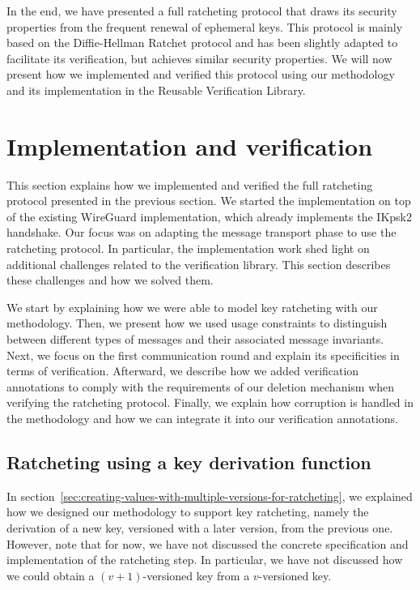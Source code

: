 In the end, we have presented a full ratcheting protocol that draws its security properties from the frequent renewal of ephemeral keys. This protocol is mainly based on the Diffie-Hellman Ratchet protocol and has been slightly adapted to facilitate its verification, but achieves similar security properties.
We will now present how we implemented and verified this protocol using our methodology and its implementation in the Reusable Verification Library. 

\section{Implementation and verification}
\label{sec:implementation-and-verification}

This section explains how we implemented and verified the full ratcheting protocol presented in the previous section.
We started the implementation on top of the existing WireGuard implementation, which already implements the IKpsk2 handshake.
Our focus was on adapting the message transport phase to use the ratcheting protocol.
In particular, the implementation work shed light on additional challenges related to the verification library. This section describes these challenges and how we solved them.

We start by explaining how we were able to model key ratcheting with our methodology.
Then, we present how we used usage constraints to distinguish between different types of messages and their associated message invariants.
Next, we focus on the first communication round and explain its specificities in terms of verification.
Afterward, we describe how we added verification annotations to comply with the requirements of our deletion mechanism when verifying the ratcheting protocol.
Finally, we explain how corruption is handled in the methodology and how we can integrate it into our verification annotations.

\subsection{Ratcheting using a key derivation function}
\label{sec:ratcheting-using-a-key-derivation-function}

In section~\ref{sec:creating-values-with-multiple-versions-for-ratcheting}, we explained how we designed our methodology to support key ratcheting, namely the derivation of a new key, versioned with a later version, from the previous one.
However, note that for now, we have not discussed the concrete specification and implementation of the ratcheting step. In particular, we have not discussed how we could obtain a $(v+1)$-versioned key from a $v$-versioned key.

